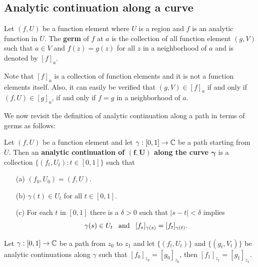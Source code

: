 \subsection{Analytic continuation along a curve}
\begin{definition}
Let $(f,U)$ be a function element where $U$ is a region and $f$ is an analytic function in $U$. The \textbf{germ} of $f$ at $a$ is the collection of all function element $(g,V)$ such that $a\in V$ and $f(z)=g(z)$ for all $z$ in a neighborhood of $a$ and is denoted by $[f]_a$.
\end{definition}
Note that $[f]_a$ is a collection of function elements and it is not a function elements itself. Also, it can easily be verified that $(g,V)\in[f]_a$ if and only if $(f,U)\in[g]_a$, if and only if $f=g$ in a neighborhood of $a$.\par
We now revisit the definition of analytic continuation along a path in terms of germs as follows:
\begin{definition}
Let $(f,U)$ be a function element and let $\gamma:[0,1]\to\mathbb{C}$ be a path starting from $U$. Then an \textbf{analytic continuation of $\bm{(f,U)}$ along the curve $\bm{\gamma}$} is a collection $\{(f_t,U_t):t\in[0,1]\}$ such that
\begin{itemize}
\item[(a)] $(f_0,U_0)=(f,U)$.
\item[(b)] $\gamma(t)\in U_t$ for all $t\in[0,1]$.
\item[(c)] For each $t$ in $[0,1]$ there is a $\delta>0$ such that $|s-t|<\delta$ implies
\[\gamma(s)\in U_t\hspace{8pt}\text{and}\hspace{8pt}[f_s]_{\gamma(s)}=[f_t]_{\gamma(t)}.\]
\end{itemize}
\end{definition}
\begin{theorem}\label{analytic continuation along curve unique}
Let $\gamma:[0,1]\to\mathbb{C}$ be a path from $z_0$ to $z_1$ and let $\{(f_t,U_t)\}$ and $\{(g_t,V_t)\}$ be analytic continuations along $\gamma$ such that $[f_0]_{z_0}=[g_0]_{z_0}$, then $[f_1]_{z_1}=[g_1]_{z_1}$.
\end{theorem}
